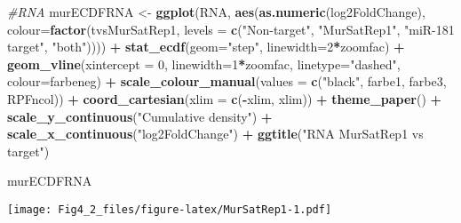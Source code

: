 \documentclass[
]{article}
\newenvironment{Shaded}{\begin{snugshade}}{\end{snugshade}}
\newcommand{\AttributeTok}[1]{\textcolor[rgb]{0.13,0.29,0.53}{#1}}
\newcommand{\CommentTok}[1]{\textcolor[rgb]{0.56,0.35,0.01}{\textit{#1}}}
\newcommand{\DecValTok}[1]{\textcolor[rgb]{0.00,0.00,0.81}{#1}}
\newcommand{\FunctionTok}[1]{\textcolor[rgb]{0.13,0.29,0.53}{\textbf{#1}}}
\newcommand{\NormalTok}[1]{#1}
\newcommand{\OtherTok}[1]{\textcolor[rgb]{0.56,0.35,0.01}{#1}}
\newcommand{\SpecialCharTok}[1]{\textcolor[rgb]{0.81,0.36,0.00}{\textbf{#1}}}
\newcommand{\StringTok}[1]{\textcolor[rgb]{0.31,0.60,0.02}{#1}}
\begin{document}
\begin{Shaded}
\begin{Highlighting}[]
\CommentTok{\#RNA}
\NormalTok{murECDFRNA }\OtherTok{\textless{}{-}} \FunctionTok{ggplot}\NormalTok{(RNA, }\FunctionTok{aes}\NormalTok{(}\FunctionTok{as.numeric}\NormalTok{(log2FoldChange), }\AttributeTok{colour=}\FunctionTok{factor}\NormalTok{(tvsMurSatRep1, }\AttributeTok{levels =} \FunctionTok{c}\NormalTok{(}\StringTok{"Non{-}target"}\NormalTok{, }\StringTok{"MurSatRep1"}\NormalTok{, }\StringTok{"miR{-}181 target"}\NormalTok{, }\StringTok{"both"}\NormalTok{)))) }\SpecialCharTok{+} 
  \FunctionTok{stat\_ecdf}\NormalTok{(}\AttributeTok{geom=}\StringTok{"step"}\NormalTok{, }\AttributeTok{linewidth=}\DecValTok{2}\SpecialCharTok{*}\NormalTok{zoomfac) }\SpecialCharTok{+}
  \FunctionTok{geom\_vline}\NormalTok{(}\AttributeTok{xintercept =} \DecValTok{0}\NormalTok{, }\AttributeTok{linewidth=}\DecValTok{1}\SpecialCharTok{*}\NormalTok{zoomfac, }\AttributeTok{linetype=}\StringTok{"dashed"}\NormalTok{, }\AttributeTok{colour=}\NormalTok{farbeneg) }\SpecialCharTok{+}
  \FunctionTok{scale\_colour\_manual}\NormalTok{(}\AttributeTok{values =} \FunctionTok{c}\NormalTok{(}\StringTok{"black"}\NormalTok{, farbe1, farbe3, RPFncol)) }\SpecialCharTok{+}
  \FunctionTok{coord\_cartesian}\NormalTok{(}\AttributeTok{xlim =} \FunctionTok{c}\NormalTok{(}\SpecialCharTok{{-}}\NormalTok{xlim, xlim)) }\SpecialCharTok{+} 
  \FunctionTok{theme\_paper}\NormalTok{() }\SpecialCharTok{+}
  \FunctionTok{scale\_y\_continuous}\NormalTok{(}\StringTok{"Cumulative density"}\NormalTok{) }\SpecialCharTok{+} \FunctionTok{scale\_x\_continuous}\NormalTok{(}\StringTok{"log2FoldChange"}\NormalTok{) }\SpecialCharTok{+}
  \FunctionTok{ggtitle}\NormalTok{(}\StringTok{"RNA MurSatRep1 vs target"}\NormalTok{)}

\NormalTok{murECDFRNA}
\end{Highlighting}
\end{Shaded}

\texttt{[image: Fig4\_2\_files/figure-latex/MurSatRep1-1.pdf]}
\end{document}
